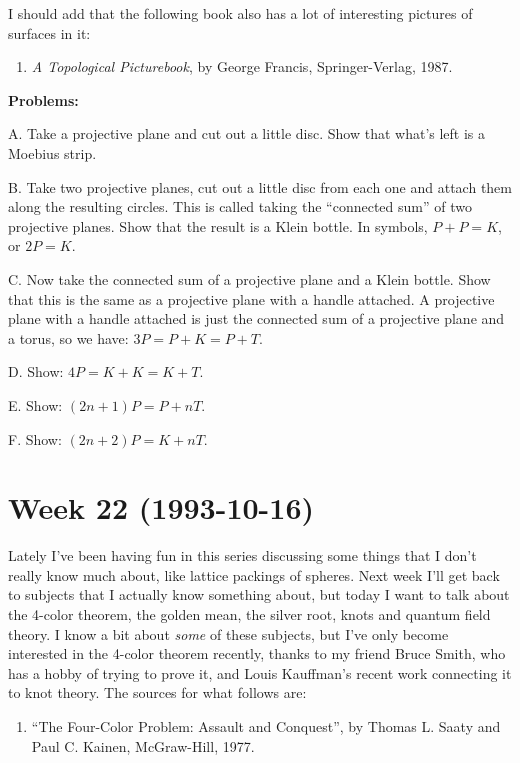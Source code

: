 \documentclass{article}
\def\tightlist{}
\begin{document}
I should add that the following book also has a lot of interesting
pictures of surfaces in it:

\begin{enumerate}
\def\labelenumi{\arabic{enumi})}
\setcounter{enumi}{2}
\tightlist
\item
  \emph{A Topological Picturebook}, by George Francis, Springer-Verlag,
  1987.
\end{enumerate}

\textbf{Problems:}

A. Take a projective plane and cut out a little disc. Show that what's
left is a Moebius strip.

B. Take two projective planes, cut out a little disc from each one and
attach them along the resulting circles. This is called taking the
``connected sum'' of two projective planes. Show that the result is a
Klein bottle. In symbols, \(P + P = K\), or \(2P = K\).

C. Now take the connected sum of a projective plane and a Klein bottle.
Show that this is the same as a projective plane with a handle attached.
A projective plane with a handle attached is just the connected sum of a
projective plane and a torus, so we have: \(3P = P + K = P + T\).

D. Show: \(4P = K + K = K + T\).

E. Show: \((2n+1)P = P + nT\).

F. Show: \((2n+2)P = K + nT\).
\hypertarget{week-22-1993-10-16}{%
\section{Week 22 (1993-10-16)}\label{week-22-1993-10-16}}

Lately I've been having fun in this series discussing some things that I
don't really know much about, like lattice packings of spheres. Next
week I'll get back to subjects that I actually know something about, but
today I want to talk about the 4-color theorem, the golden mean, the
silver root, knots and quantum field theory. I know a bit about
\emph{some} of these subjects, but I've only become interested in the
4-color theorem recently, thanks to my friend Bruce Smith, who has a
hobby of trying to prove it, and Louis Kauffman's recent work connecting
it to knot theory. The sources for what follows are:

\begin{enumerate}
\def\labelenumi{\arabic{enumi})}
\tightlist
\item
  ``The Four-Color Problem: Assault and Conquest'', by Thomas L. Saaty
  and Paul C. Kainen, McGraw-Hill, 1977.
\end{enumerate}
\end{document}
